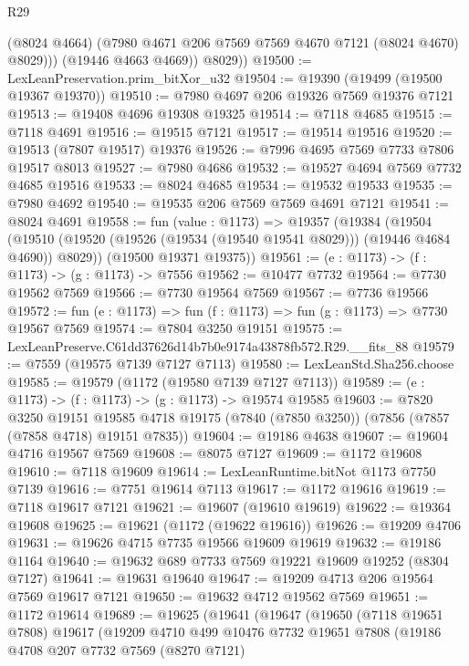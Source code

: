 \begin{lexlean}{R29}
\begin{coremodule}
              (@8024 @4664)
              (@7980 @4671 @206 @7569 @7569 @4670 @7121 (@8024 @4670) @8029)))
          (@19446 @4663 @4669))
        @8029))
@19500 := LexLeanPreservation.prim_bitXor_u32
@19504 := @19390 (@19499 (@19500 @19367 @19370))
@19510 := @7980 @4697 @206 @19326 @7569 @19376 @7121
@19513 := @19408 @4696 @19308 @19325
@19514 := @7118 @4685
@19515 := @7118 @4691
@19516 := @19515 @7121
@19517 := @19514 @19516
@19520 := @19513 (@7807 @19517) @19376
@19526 := @7996 @4695 @7569 @7733 @7806 @19517 @8013
@19527 := @7980 @4686
@19532 := @19527 @4694 @7569 @7732 @4685 @19516
@19533 := @8024 @4685
@19534 := @19532 @19533
@19535 := @7980 @4692
@19540 := @19535 @206 @7569 @7569 @4691 @7121
@19541 := @8024 @4691
@19558 := fun (value : @1173) =>
  @19357
    (@19384
      (@19504 (@19510 (@19520 (@19526 (@19534 (@19540 @19541 @8029))) (@19446 @4684 @4690)) @8029))
      (@19500 @19371 @19375))
@19561 := (e : @1173) -> (f : @1173) -> (g : @1173) -> @7556
@19562 := @10477 @7732
@19564 := @7730 @19562 @7569
@19566 := @7730 @19564 @7569
@19567 := @7736 @19566
@19572 := fun (e : @1173) => fun (f : @1173) => fun (g : @1173) => @7730 @19567 @7569
@19574 := @7804 @3250 @19151
@19575 := LexLeanPreserve.C61dd37626d14b7b0e9174a43878fb572.R29.__fits_88
@19579 := @7559 (@19575 @7139 @7127 @7113)
@19580 := LexLeanStd.Sha256.choose
@19585 := @19579 (@1172 (@19580 @7139 @7127 @7113))
@19589 := (e : @1173) -> (f : @1173) -> (g : @1173) -> @19574 @19585
@19603 := @7820
    @3250
    @19151
    @19585
    @4718
    @19175
    (@7840 (@7850 @3250))
    (@7856 (@7857 (@7858 @4718) @19151 @7835))
@19604 := @19186 @4638
@19607 := @19604 @4716 @19567 @7569
@19608 := @8075 @7127
@19609 := @1172 @19608
@19610 := @7118 @19609
@19614 := LexLeanRuntime.bitNot @1173 @7750 @7139
@19616 := @7751 @19614 @7113
@19617 := @1172 @19616
@19619 := @7118 @19617 @7121
@19621 := @19607 (@19610 @19619)
@19622 := @19364 @19608
@19625 := @19621 (@1172 (@19622 @19616))
@19626 := @19209 @4706
@19631 := @19626 @4715 @7735 @19566 @19609 @19619
@19632 := @19186 @1164
@19640 := @19632 @689 @7733 @7569 @19221 @19609 @19252 (@8304 @7127)
@19641 := @19631 @19640
@19647 := @19209 @4713 @206 @19564 @7569 @19617 @7121
@19650 := @19632 @4712 @19562 @7569
@19651 := @1172 @19614
@19689 := @19625
    (@19641
      (@19647
        (@19650
          (@7118 @19651 @7808)
          @19617
          (@19209
            @4710
            @499
            @10476
            @7732
            @19651
            @7808
            (@19186
              @4708
              @207
              @7732
              @7569
              (@8270 @7121)

\end{coremodule}
\end{lexlean}
